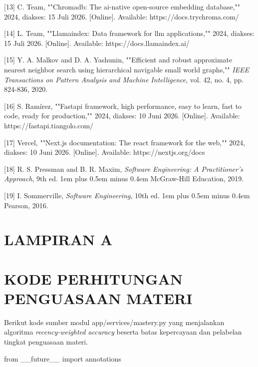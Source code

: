 \documentclass[12pt,a4paper]{article}
\begin{document}
{[}13{]}	C. Team, ""Chromadb: The ai-native open-source embedding database,"" 2024, diakses: 15 Juli 2026. {[}Online{]}. Available: https://docs.trychroma.com/



{[}14{]}	L. Team, ""Llamaindex: Data framework for llm applications,"" 2024, diakses: 15 Juli 2026. {[}Online{]}. Available: https://docs.llamaindex.ai/



{[}15{]}	Y. A. Malkov and D. A. Yashunin, ""Efficient and robust approximate nearest neighbor search using hierarchical navigable small world graphs,"" \textit{IEEE Transactions on Pattern Analysis and Machine Intelligence}, vol. 42, no. 4, pp. 824-836, 2020.



{[}16{]}	S. Ramírez, ""Fastapi framework, high performance, easy to learn, fast to code, ready for production,"" 2024, diakses: 10 Juni 2026. {[}Online{]}. Available: https://fastapi.tiangolo.com/



{[}17{]}	Vercel, ""Next.js documentation: The react framework for the web,"" 2024, diakses: 10 Juni 2026. {[}Online{]}. Available: https://nextjs.org/docs



{[}18{]}	R. S. Pressman and B. R. Maxim, \textit{Software Engineering: A Practitioner's Approach}, 9th ed. 1em plus 0.5em minus 0.4em McGraw-Hill Education, 2019.



{[}19{]}	I. Sommerville, \textit{Software Engineering}, 10th ed. 1em plus 0.5em minus 0.4em Pearson, 2016.



\section*{LAMPIRAN A}

\section*{KODE PERHITUNGAN PENGUASAAN MATERI}

Berikut kode sumber modul app/services/mastery.py yang menjalankan algoritma \textit{recency-weighted accuracy} beserta batas kepercayaan dan pelabelan tingkat penguasaan materi.



from \_\_future\_\_ import annotations
\end{document}
